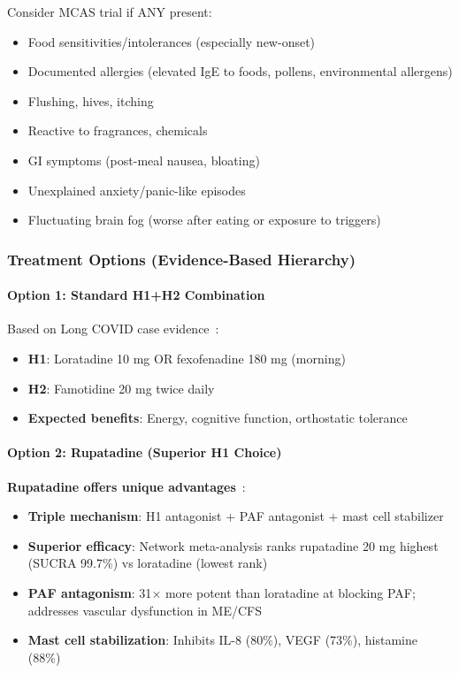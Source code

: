 Consider MCAS trial if ANY present:
\begin{itemize}
    \item Food sensitivities/intolerances (especially new-onset)
    \item Documented allergies (elevated IgE to foods, pollens, environmental allergens)
    \item Flushing, hives, itching
    \item Reactive to fragrances, chemicals
    \item GI symptoms (post-meal nausea, bloating)
    \item Unexplained anxiety/panic-like episodes
    \item Fluctuating brain fog (worse after eating or exposure to triggers)
\end{itemize}

\subsubsection{Treatment Options (Evidence-Based Hierarchy)}

\paragraph{Option 1: Standard H1+H2 Combination}
Based on Long COVID case evidence~\cite{Davis2023}:
\begin{itemize}
    \item \textbf{H1}: Loratadine 10 mg OR fexofenadine 180 mg (morning)
    \item \textbf{H2}: Famotidine 20 mg twice daily
    \item \textbf{Expected benefits}: Energy, cognitive function, orthostatic tolerance
\end{itemize}

\paragraph{Option 2: Rupatadine (Superior H1 Choice)}
\textbf{Rupatadine offers unique advantages}~\cite{Pinero-Gonzalez2024,Mullol2008}:
\begin{itemize}
    \item \textbf{Triple mechanism}: H1 antagonist + PAF antagonist + mast cell stabilizer
    \item \textbf{Superior efficacy}: Network meta-analysis ranks rupatadine 20 mg highest (SUCRA 99.7\%) vs loratadine (lowest rank)~\cite{Mullol2008}
    \item \textbf{PAF antagonism}: 31$\times$ more potent than loratadine at blocking PAF; addresses vascular dysfunction in ME/CFS~\cite{Pinero-Gonzalez2024}
    \item \textbf{Mast cell stabilization}: Inhibits IL-8 (80\%), VEGF (73\%), histamine (88\%)~\cite{Pinero-Gonzalez2024}
\end{itemize}

